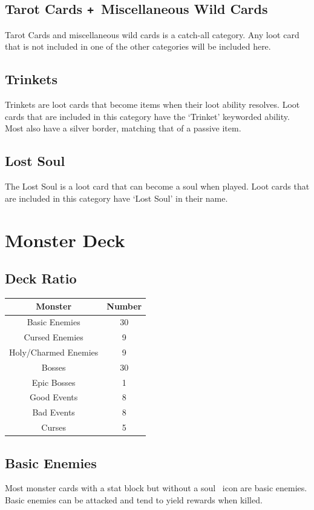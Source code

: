 \documentclass[
  fontsize=10pt,
  paper=a5,
  version=last,
  chapterprefix=true,
  bindingoffset=5mm,
  ]{scrbook}
\newcommand*{\inlineicon}[1]{%
    \raisebox{-.3\baselineskip}{%
        \smash{%
            \texttt{[image: \#1]}%
        }%
    }%
}
\newcommand{\soul}{\inlineicon{./assets/ms-soul.png}}
\def\plus{\texttt{+}}
\begin{document}
    \subsection*{Tarot Cards \plus\ Miscellaneous Wild Cards}
    Tarot Cards and miscellaneous wild cards is a catch-all category. Any loot card that is not included in one of the other categories will be included here.
    \subsection*{Trinkets}
    Trinkets are loot cards that become items when their loot ability resolves. Loot cards that are included in this category have the ‘Trinket’ keyworded ability. Most also have a silver border, matching that of a passive item.
    \subsection*{Lost Soul}
    The Lost Soul is a loot card that can become a soul when played. Loot cards that are included in this category have ‘Lost Soul’ in their name.

    \section{Monster Deck}
    \subsection*{Deck Ratio}
    \begin{tabular}{ | c | c | }
        \hline
        \textbf{Monster} & \textbf{Number}\\
        \hline 
        Basic Enemies & 30\\
        Cursed Enemies & 9\\
        Holy/Charmed Enemies & 9\\
        Bosses & 30\\
        Epic Bosses & 1\\
        Good Events & 8\\
        Bad Events & 8\\
        Curses & 5\\
        \hline
    \end{tabular}
    \subsection*{Basic Enemies}
    Most monster cards with a stat block but without a soul\soul\ icon are basic enemies. Basic enemies can be attacked and tend to yield rewards when killed.
\end{document}
